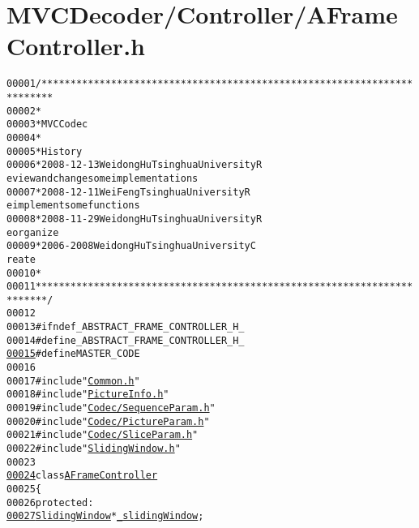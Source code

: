 \hypertarget{_a_frame_controller_8h_source}{
\section{MVCDecoder/Controller/AFrameController.h}
}


\begin{footnotesize}\begin{alltt}
00001 \textcolor{comment}{/************************************************************************}
00002 \textcolor{comment}{ *}
00003 \textcolor{comment}{ * MVC Codec}
00004 \textcolor{comment}{ * }
00005 \textcolor{comment}{ * History}
00006 \textcolor{comment}{ * 2008-12-13           Weidong Hu              Tsinghua University             R
      eview and change some implementations}
00007 \textcolor{comment}{ * 2008-12-11           Wei Feng                Tsinghua University             R
      eimplement some functions}
00008 \textcolor{comment}{ * 2008-11-29           Weidong Hu              Tsinghua University             R
      eorganize}
00009 \textcolor{comment}{ * 2006-2008            Weidong Hu              Tsinghua University             C
      reate}
00010 \textcolor{comment}{ * }
00011 \textcolor{comment}{ ************************************************************************/}
00012 
00013 \textcolor{preprocessor}{#ifndef \_ABSTRACT\_FRAME\_CONTROLLER\_H\_}
00014 \textcolor{preprocessor}{}\textcolor{preprocessor}{#define \_ABSTRACT\_FRAME\_CONTROLLER\_H\_}
\hypertarget{_a_frame_controller_8h_source_l00015}{}\hyperlink{_a_frame_controller_8h_aac0db9a0280340fa820b89366c85d392}{00015} \textcolor{preprocessor}{}\textcolor{preprocessor}{#define MASTER\_CODE}
00016 \textcolor{preprocessor}{}
00017 \textcolor{preprocessor}{#include "\hyperlink{_common_8h}{Common.h}"}
00018 \textcolor{preprocessor}{#include "\hyperlink{_picture_info_8h}{PictureInfo.h}"}
00019 \textcolor{preprocessor}{#include "\hyperlink{_sequence_param_8h}{Codec/SequenceParam.h}"}
00020 \textcolor{preprocessor}{#include "\hyperlink{_picture_param_8h}{Codec/PictureParam.h}"}
00021 \textcolor{preprocessor}{#include "\hyperlink{_slice_param_8h}{Codec/SliceParam.h}"}
00022 \textcolor{preprocessor}{#include "\hyperlink{_sliding_window_8h}{SlidingWindow.h}"}
00023 
\hypertarget{_a_frame_controller_8h_source_l00024}{}\hyperlink{class_a_frame_controller}{00024} \textcolor{keyword}{class }\hyperlink{class_a_frame_controller}{AFrameController} 
00025 \{
00026 \textcolor{keyword}{protected}:
\hypertarget{_a_frame_controller_8h_source_l00027}{}\hyperlink{class_a_frame_controller_aca7790494d5c5d114171269ddaabd568}{00027}         \hyperlink{class_sliding_window}{SlidingWindow} *\hyperlink{class_a_frame_controller_aca7790494d5c5d114171269ddaabd568}{_slidingWindow};

\end{alltt}
\end{footnotesize}
